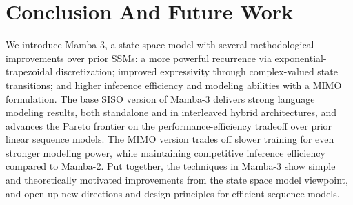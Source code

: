 \section{Conclusion And Future Work}
We introduce Mamba-3, a state space model with several methodological improvements over prior SSMs: a more powerful recurrence via exponential-trapezoidal discretization; improved expressivity through complex-valued state transitions; and higher inference efficiency and modeling abilities with a MIMO formulation.
The base SISO version of Mamba-3 delivers strong language modeling results, both standalone and in interleaved hybrid architectures, and advances the Pareto frontier on the performance-efficiency tradeoff over prior linear sequence models.
The MIMO version trades off slower training for even stronger modeling power, while maintaining competitive inference efficiency compared to Mamba-2.
Put together, the techniques in Mamba-3 show simple and theoretically motivated improvements from the state space model viewpoint, and open up new directions and design principles for efficient sequence models.

